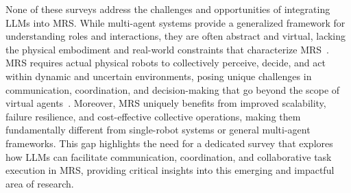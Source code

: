 None of these surveys address the challenges and opportunities of integrating LLMs into MRS. While multi-agent systems provide a generalized framework for understanding roles and interactions, they are often abstract and virtual, lacking the physical embodiment and real-world constraints that characterize MRS~\cite{guo_large_2024}. MRS requires actual physical robots to collectively perceive, decide, and act within dynamic and uncertain environments, posing unique challenges in communication, coordination, and decision-making that go beyond the scope of virtual agents~\cite{wallkotter2021explainable}. Moreover, MRS uniquely benefits from improved scalability, failure resilience, and cost-effective collective operations, making them fundamentally different from single-robot systems or general multi-agent frameworks. This gap highlights the need for a dedicated survey that explores how LLMs can facilitate communication, coordination, and collaborative task execution in MRS, providing critical insights into this emerging and impactful area of research.